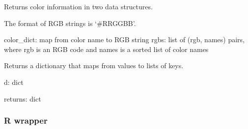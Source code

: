 \documentclass[letterpaper,10pt,english]{sphinxmanual}
\begin{document}

\begin{fulllineitems}
\label{\detokenize{_autosummary/analytics_core.viz:analytics_core.viz.color_list.read_colors}}
Returns color information in two data structures.

The format of RGB strings is ‘\#RRGGBB’.

color\_dict: map from color name to RGB string
rgbs: list of (rgb, names) pairs, where rgb is an RGB code and             names is a sorted list of color names

\end{fulllineitems}


\begin{fulllineitems}
\label{\detokenize{_autosummary/analytics_core.viz:analytics_core.viz.color_list.invert_dict}}
Returns a dictionary that maps from values to lists of keys.

d: dict

returns: dict

\end{fulllineitems}



\subsubsection{R wrapper}
\label{\detokenize{_autosummary/analytics_core:module-analytics_core.R_wrapper}}\label{\detokenize{_autosummary/analytics_core:r-wrapper}}

\begin{fulllineitems}
\label{\detokenize{_autosummary/analytics_core:analytics_core.R_wrapper.call_Rpackage}}
\end{fulllineitems}
\end{document}
